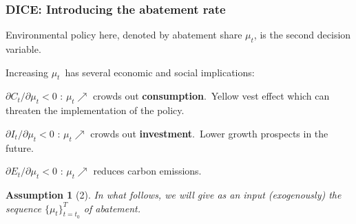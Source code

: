 \documentclass[xcolor=x11names,compress,aspectratio=169]{beamer}%
\makeatletter
\newtheorem{assumption}[theorem]{Assumption}
\renewenvironment{itemize}{\begin{compactitemize}[<+-| alert@+>]}{\end{compactitemize}}
\makeatother
\begin{document}
\begin{frame}%
%

\frametitle{DICE: Introducing the abatement rate }%


\begin{itemize}
\item Environmental policy here, denoted by abatement share $\mu_{t}$, is the
second decision variable.%
\vspace{1ex}%


\item Increasing $\mu_{t}$\ has several economic and social implications:%
\vspace{1ex}%


\begin{itemize}
\item $\partial C_{t}/\partial\mu_{t}<0$ : $\mu_{t}\nearrow$ crowds out
\textbf{consumption}.\ Yellow vest effect which can threaten the
implementation of the policy.%
\vspace{1ex}%


\item $\partial I_{t}/\partial\mu_{t}<0$ : $\mu_{t}\nearrow$ crowds out
\textbf{investment}.\ Lower growth prospects in the future.%
\vspace{1ex}%


\item $\partial E_{t}/\partial\mu_{t}<0$ : $\mu_{t}\nearrow$ reduces carbon
emissions.%
\vspace{1ex}%

\end{itemize}
\end{itemize}

\begin{assumption}
[2]In what follows, we will give as an input (exogenously) the sequence
$\{\mu_{t}\}_{t=t_{0}}^{T}$ of abatement.
\end{assumption}

%

\transboxout
\end{frame}%
%
\end{document}
